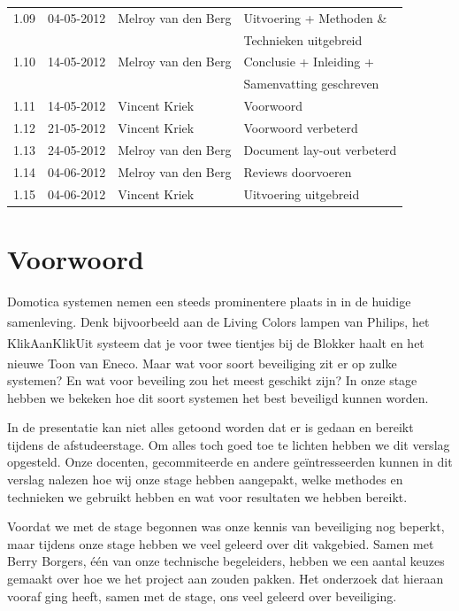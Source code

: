 \documentclass[]{article}
\begin{document}
\begin{tabular}{|| l | l | l | l ||}
    1.09    &04-05-2012  &Melroy van den Berg &Uitvoering + Methoden \&        \\ 
            &            &                    &Technieken uitgebreid           \\\hline
    1.10    &14-05-2012  &Melroy van den Berg &Conclusie + Inleiding +         \\
            &            &                    &Samenvatting geschreven         \\\hline 
    1.11    &14-05-2012  &Vincent Kriek       &Voorwoord                       \\\hline
    1.12    &21-05-2012  &Vincent Kriek       &Voorwoord verbeterd             \\\hline
    1.13    &24-05-2012  &Melroy van den Berg &Document lay-out verbeterd      \\\hline
    1.14    &04-06-2012  &Melroy van den Berg &Reviews doorvoeren	           \\\hline
    1.15    &04-06-2012  &Vincent Kriek       &Uitvoering uitgebreid           \\\hline
\end{tabular}

\newpage
\section*{Voorwoord}
Domotica systemen nemen een steeds prominentere plaats in in de huidige
samenleving. Denk bijvoorbeeld aan de Living Colors lampen van
Philips\textsuperscript{\texttrademark}, het
KlikAanKlikUit\textsuperscript{\textregistered} systeem dat je voor twee tientjes bij de Blokker haalt en het
nieuwe Toon\textsuperscript{\textregistered} van Eneco. Maar wat voor soort beveiliging zit er op zulke systemen?
En wat voor beveiling zou het meest geschikt zijn? In onze stage hebben we bekeken
hoe dit soort systemen het best beveiligd kunnen worden.

In de presentatie kan niet alles getoond worden dat er is gedaan en bereikt
tijdens de afstudeerstage. Om alles toch goed toe te lichten hebben we dit
verslag opgesteld.  Onze docenten, gecommiteerde en andere ge\"intresseerden
kunnen in dit verslag nalezen hoe wij onze stage hebben aangepakt, welke
methodes en technieken we gebruikt hebben en wat voor resultaten we hebben
bereikt.

Voordat we met de stage begonnen was onze kennis van beveiliging nog beperkt,
maar tijdens onze stage hebben we veel geleerd over dit vakgebied. Samen met
Berry Borgers, \'e\'en van onze technische begeleiders, hebben we een aantal keuzes
gemaakt over hoe we het project aan zouden pakken. Het onderzoek dat hieraan
vooraf ging heeft, samen met de stage, ons veel geleerd over beveiliging.
\end{document}
